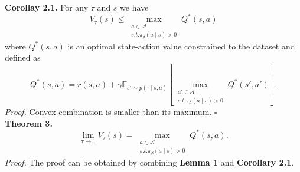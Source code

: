 \textbf{Corollay 2.1.} For any \(\tau\) and \(s\) we have
\begin{equation*}
    V_\tau(s) \leq \max_{\substack{ a \in \mathcal{A} \\ s.t. \pi_\beta(a \mid s) > 0}} Q^\ast(s,a)
\end{equation*}
where \(Q^\ast(s, a)\) is an optimal state-action value constrained to the dataset and defined as
\begin{equation*}
    Q^\ast(s, a) = r(s, a) + \gamma \mathbb{E}_{s' \sim p(\cdot \mid s, a)}\left[\max_{\substack{a' \in \mathcal{A} \\ s.t. \pi_\beta(a \mid s) > 0}} Q^\ast(s', a')\right].
\end{equation*}
\textit{Proof.} Convex combination is smaller than its maximum.
\hfill \(\square\)
\\
\textbf{Theorem 3.}
\begin{equation*}
    \lim_{\tau \to 1} V_\tau(s) = \max_{\substack{a \in \mathcal{A} \\ s.t. \pi_\beta(a \mid s) > 0}}Q^\ast(s,a).
\end{equation*}
\textit{Proof.} The proof can be obtained by combining \textbf{Lemma 1} and \textbf{Corollary 2.1}.